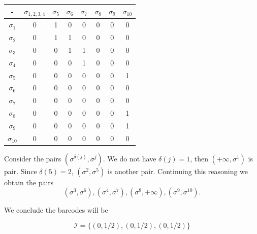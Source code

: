 \begin{center}
    \begin{tabular}{|c|c|c|c|c|c|c|c|}
        \hline
        -             & $\sigma_{1,2,3,4}$ & $\sigma_5$ & $\sigma_6$ & $\sigma_7$ & $\sigma_8$ & $\sigma_9$ & $\sigma_{10}$ \\ \hline
        $\sigma_1$    & 0                  & 1          & 0          & 0          & 0          & 0          & 0             \\ \hline
        $\sigma_2$    & 0                  & 1          & 1          & 0          & 0          & 0          & 0             \\ \hline
        $\sigma_3$    & 0                  & 0          & 1          & 1          & 0          & 0          & 0             \\ \hline
        $\sigma_4$    & 0                  & 0          & 0          & 1          & 0          & 0          & 0             \\ \hline
        $\sigma_5$    & 0                  & 0          & 0          & 0          & 0          & 0          & 1             \\ \hline
        $\sigma_6$    & 0                  & 0          & 0          & 0          & 0          & 0          & 0             \\ \hline
        $\sigma_7$    & 0                  & 0          & 0          & 0          & 0          & 0          & 0             \\ \hline
        $\sigma_8$    & 0                  & 0          & 0          & 0          & 0          & 0          & 1             \\ \hline
        $\sigma_9$    & 0                  & 0          & 0          & 0          & 0          & 0          & 1             \\ \hline
        $\sigma_{10}$ & 0                  & 0          & 0          & 0          & 0          & 0          & 0             \\ \hline
        \end{tabular}
\end{center}

Consider the pairs $(\sigma^{\delta(j)}, \sigma^j)$. We do not have $\delta(j)
= 1$, then $(+\infty, \sigma^1)$ is pair. Since $\delta(5) = 2$, $(\sigma^2,
\sigma^5)$ is another pair. Continuing this reasoning we obtain the pairs 
$$(\sigma^3, \sigma^6), (\sigma^4, \sigma^7), (\sigma^8, + \infty), (\sigma^9,
\sigma^{10}).$$  

We conclude the barcodes will be 

$$\mathcal{I} = \{(0, 1/2), (0, 1/2), (0, 1/2)\}$$